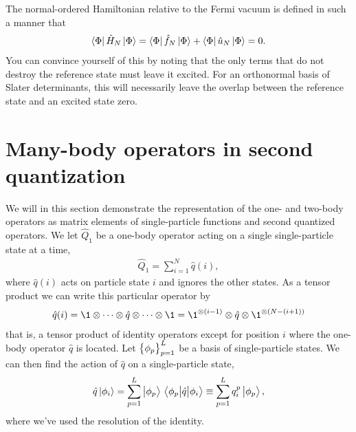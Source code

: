         The normal-ordered Hamiltonian relative to the Fermi vacuum is defined
        in such a manner that
        \begin{align}
            \bra{\Phi}\hat{H}_N\ket{\Phi}
            = \bra{\Phi}\hat{f}_N\ket{\Phi}
            + \bra{\Phi}\hat{u}_N\ket{\Phi}
            = 0.
        \end{align}
        You can convince yourself of this by noting that the only terms that
        do not destroy the reference state must leave it excited.
        For an orthonormal basis of Slater determinants, this will necessarily
        leave the overlap between the reference state and an excited state zero.

    \section{Many-body operators in second quantization}
        \label{app:operator-representation}
        We will in this section demonstrate the representation of the one- and
        two-body operators as matrix elements of single-particle functions and
        second quantized operators.
        We let $\hat{Q}_1$ be a one-body operator acting on a single
        single-particle state at a time,
        \begin{align}
            \hat{Q}_1
            = \sum_{i = 1}^{N}\hat{q}(i),
        \end{align}
        where $\hat{q}(i)$ acts on particle state $i$ and ignores the other
        states.
        As a tensor product we can write this particular operator by
        \begin{align}
            \hat{q}(i)
            = \1\otimes
            \dots\otimes\hat{q}\otimes\dots\otimes\1
            = \1^{\otimes (i - 1)}
            \otimes\hat{q}
            \otimes\1^{\otimes (N - (i + 1))}
            \label{eq:tensor-one-body}
        \end{align}
        that is, a tensor product of identity operators except for position $i$
        where the one-body operator $\hat{q}$ is located.
        Let $\left\{ \phi_p \right\}_{p = 1}^{L}$ be a basis of single-particle states.
        We can then find the action of $\hat{q}$ on a single-particle state,
        \begin{align}
            \hat{q}\ket{\phi_i}
            = \sum_{p = 1}^{L}\ket{\phi_{p}}\mel{\phi_p}{\hat{q}}{\phi_i}
            \equiv \sum_{p = 1}^{L} q^{p}_{i}\ket{\phi_p},
        \end{align}
        where we've used the resolution of the identity.
